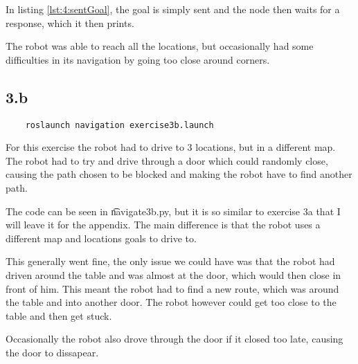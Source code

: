 In listing \ref{lst:4:sentGoal}, the goal is simply sent and the node then waits for a response, which it then prints.

The robot was able to reach all the locations, but occasionally had some difficulties in its navigation by going too close around corners. 

\subsection*{3.b}
\begin{lstlisting}
	roslaunch navigation exercise3b.launch
\end{lstlisting}

For this exercise the robot had to drive to 3 locations, but in a different map. The robot had to try and drive through a door which could randomly close, causing the path chosen to be blocked and making the robot have to find another path.

The code can be seen in \t{navigate3b.py}, but it is so similar to exercise 3a that I will leave it for the appendix. The main difference is that the robot uses a different map and locations goals to drive to.

This generally went fine, the only issue we could have was that the robot had driven around the table and was almost at the door, which would then close in front of him. This meant the robot had to find a new route, which was around the table and into another door. The robot however could get too close to the table and then get stuck.

Occasionally the robot also drove through the door if it closed too late, causing the door to dissapear.
